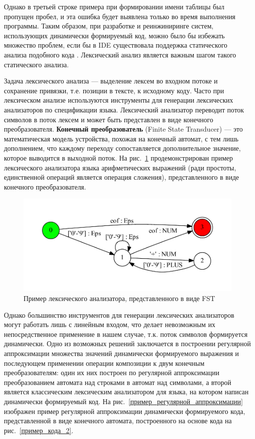 \documentclass[14pt]{matmex-diploma}
\begin{document}
Однако в третьей строке примера при формировании имени таблицы был пропущен пробел, и эта ошибка будет выявлена только во время выполнения программы. Таким образом, при разработке и реинжиниринге систем, использующих динамически формируемый код, можно было бы избежать множество проблем, если бы в IDE существовала поддержка статического анализа подобного кода \cite{string_embedded}. Лексический анализ является важным шагом такого статического анализа.

Задача лексического анализа — выделение лексем во входном потоке и сохранение привязки, т.е. позиции в тексте, к исходному коду. Часто при лексическом анализе используются инструменты для генерации лексических анализаторов по спецификации языка. Лексический анализатор переводит поток символов в поток лексем и может быть представлен в виде конечного преобразователя. \textbf{Конечный преобразователь} (Finite State Transducer) — это математическая модель устройства, похожая на конечный автомат, с тем лишь дополнением, что каждому переходу сопоставляется дополнительное значение, которое выводится в выходной поток. На рис.~\ref{пример_лексического_анализатора} продемонстрирован пример лексического анализатора языка арифметических выражений (ради простоты, единственной операций является операция сложения), представленного в виде конечного преобразователя.

\begin{figure}[h]
\centering
\includegraphics{pictures/lexer_.pdf}
\caption{Пример лексического анализатора, представленного в виде FST}
\label{пример_лексического_анализатора}
\end{figure}

Однако большинство инструментов для генерации лексических анализаторов могут работать лишь с линейным входом, что делает невозможным их непосредственное применение в нашем случае, т.к. поток символов формируется динамически. Одно из возможных решений \cite{polubelova} заключается в построении регулярной аппроксимации множества значений динамически формируемого выражения и последующем применении операции композиции \cite{handbook_automata} к двум конечным преобразователям: один их них построен по регулярной аппроксимации преобразованием автомата над строками в автомат над символами, а второй является классическим лексическим анализатором для языка, на котором написан динамически формируемый код. На рис.~\ref{пример_регулярной_аппроксимации} изображен пример регулярной аппроксимации динамически формируемого кода, представленной в виде конечного автомата, построенного на основе кода на рис.~\ref{пример_кода_2}. 
\end{document}
